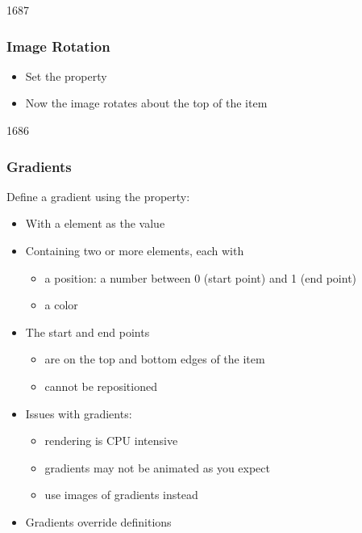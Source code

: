 
\begin{slide}{1687}\frametitle{Image Rotation}


\begin{itemize}
\item Set the  property
\item Now the image rotates about the top of the item
\end{itemize}

\end{slide}


\begin{slide}{1686}\frametitle{Gradients}

Define a gradient using the  property:

\begin{itemize}
\item With a  element as the value
\item Containing two or more  elements, each with
  \begin{itemize}
  \item a position: a number between 0 (start point) and 1 (end point)
  \item a color
  \end{itemize}
\item The start and end points
  \begin{itemize}
    \item are on the top and bottom edges of the item
    \item cannot be repositioned
  \end{itemize}
\item Issues with gradients:
  \begin{itemize}
  \item rendering is CPU intensive
  \item gradients may not be animated as you expect
  \item use images of gradients instead
  \end{itemize}
\item Gradients override  definitions
\end{itemize}

\end{slide}


